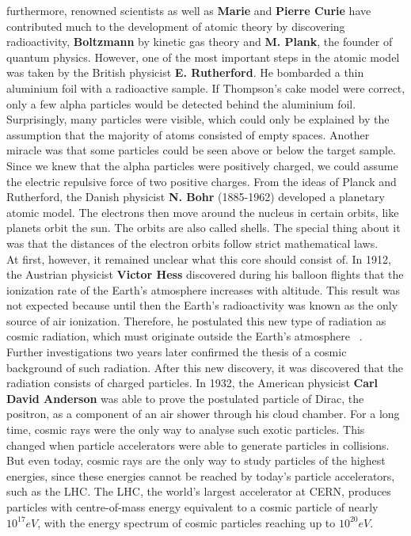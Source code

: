 furthermore, renowned scientists as well as \textbf{Marie} and \textbf{Pierre Curie} have contributed much to the development of atomic theory by discovering radioactivity, \textbf{Boltzmann} by kinetic gas theory and \textbf{M. Plank}, the founder of quantum physics.
However, one of the most important steps in the atomic model was taken by the British physicist \textbf{E. Rutherford}. He bombarded a thin aluminium foil with a radioactive sample. If Thompson's cake model were correct, only a few alpha particles would be detected behind the aluminium foil. Surprisingly, many particles were visible, which could only be explained by the assumption that the majority of atoms consisted of empty spaces. Another miracle was that some particles could be seen above or below the target sample. Since we knew that the alpha particles were positively charged, we could assume the electric repulsive force of two positive charges. From the ideas of Planck and Rutherford, the Danish physicist \textbf{N. Bohr} (1885-1962) developed a planetary atomic model. The electrons then move around the nucleus in certain orbits, like planets orbit the sun. The orbits are also called shells. The special thing about it was that the distances of the electron orbits follow strict mathematical laws.\\  
At first, however, it remained unclear what this core should consist of. \cite{haken2013atom, demtroder2005experimentalphysik}   
In 1912, the Austrian physicist \textbf{Victor Hess} discovered during his balloon flights that the ionization rate of the Earth's atmosphere increases with altitude. This result was not expected because until then the Earth's radioactivity was known as the only source of air ionization. Therefore, he postulated this new type of radiation as cosmic radiation, which must originate outside the Earth's atmosphere ~\cite{Ender}.\\
Further investigations two years later confirmed the thesis of a cosmic background of such radiation. After this new discovery, it was discovered that the radiation consists of charged particles. In 1932, the American physicist \textbf{Carl David Anderson} was able to prove the postulated particle of Dirac, the positron, as a component of an air shower through his cloud chamber. For a long time, cosmic rays were the only way to analyse such exotic particles.\cite{Bluemer:2009zf}
This changed when particle accelerators were able to generate particles in collisions. But even today, cosmic rays are the only way to study particles of the highest energies, since these energies cannot be reached by today's particle accelerators, such as the LHC. The LHC, the world's largest accelerator at CERN, produces particles with centre-of-mass energy equivalent to a cosmic particle of nearly $10^{17} eV $, with the energy spectrum of cosmic particles reaching up to $10^{20} eV $.
